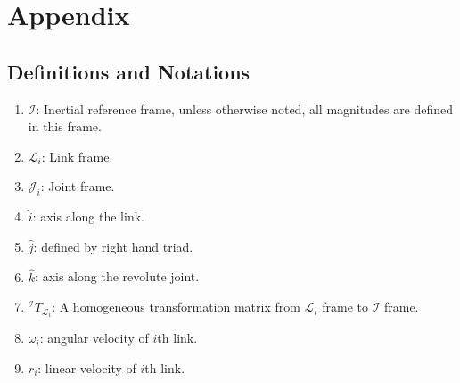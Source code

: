 \section{Appendix}
\subsection{Definitions and Notations}
\begin{enumerate}
    \item $\mathcal{I}$: Inertial reference frame, unless otherwise noted, all magnitudes are defined in this frame.
    \item $\mathcal{L}_i$: Link frame.
    \item $\mathcal{J}_i$: Joint frame.
    \item $\hat{i}$: axis along the link.
    \item $\hat{j}$: defined by right hand triad.
    \item $\hat{k}$: axis along the revolute joint.
    \item $^\mathcal{I}T_{\mathcal{L}_i}$: A homogeneous transformation matrix from $\mathcal{L}_i$ frame to $\mathcal{I}$ frame.
    \item $\omega_i$: angular velocity of $i$th link.
    \item $\dot{r}_i$: linear velocity of $i$th link.
\end{enumerate}

\pagebreak